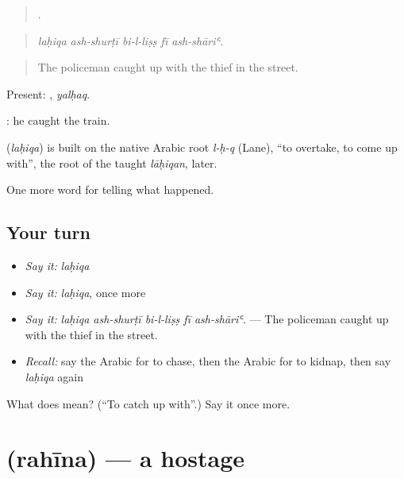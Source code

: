 \begin{quote}
    .
\end{quote}

\begin{quote}
\emph{laḥiqa ash-shurṭī bi-l-liṣṣ fī ash-shāriʿ.}
\end{quote}

\begin{quote}
The policeman caught up with the thief in the street.
\end{quote}

Present: , \emph{yalḥaq}.

 : he caught the train.

\begin{cousinweb}
\textbf{} (\emph{laḥiqa}) is built on the native Arabic root \emph{l-ḥ-q} (Lane), \textquotedblleft{}to overtake, to come up with\textquotedblright{}, the root of the taught \emph{lāḥiqan}, later.
\end{cousinweb}

\begin{grammarlens}[title={What you've built}]
One more word for telling what happened.
\end{grammarlens}

\subsection*{Your turn}
\begin{itemize}
\raggedright
  \item \emph{Say it:} \emph{laḥiqa}
  \item \emph{Say it:} \emph{laḥiqa}, once more
  \item \emph{Say it:} \emph{laḥiqa ash-shurṭī bi-l-liṣṣ fī ash-shāriʿ.} — The policeman caught up with the thief in the street.
  \item \emph{Recall:} say the Arabic for to chase, then the Arabic for to kidnap, then say \emph{laḥiqa} again
\end{itemize}

\begin{tcolorbox}[breakable,colback=teal!4,colframe=teal!35!black,title={Before you move on}]
What does  mean? (\textquotedblleft{}To catch up with\textquotedblright{}.) Say it once more.
\end{tcolorbox}
\section[\texorpdfstring{\ar{رهينة} (rahīna)}{رهينة (rahīna)}]{ (rahīna) — a hostage}


